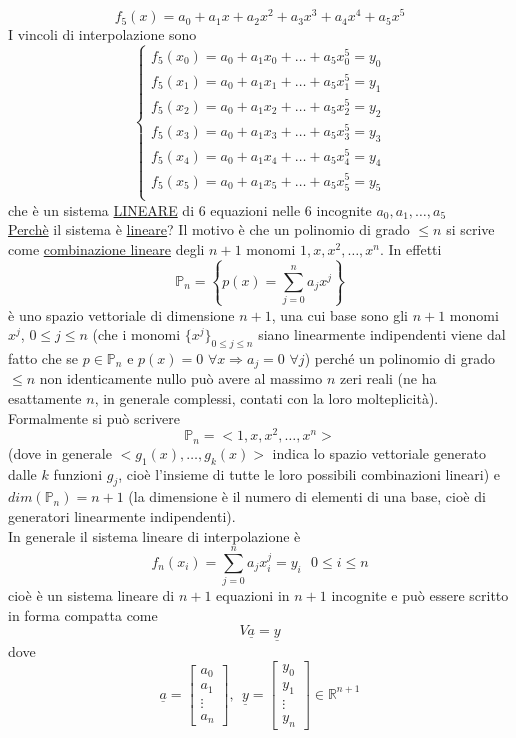 \documentclass[12pt]{article}
\begin{document}
\[
    f_5(x)=a_0+a_1x+a_2x^2+a_3x^3+a_4x^4+a_5x^5
\]
I vincoli di interpolazione sono 
\[
    \begin{cases}
        f_5(x_0)=a_0+a_1x_0+\dotso+a_5x_0^5=y_0\\
        f_5(x_1)=a_0+a_1x_1+\dotso+a_5x_1^5=y_1\\
        f_5(x_2)=a_0+a_1x_2+\dotso+a_5x_2^5=y_2\\
        f_5(x_3)=a_0+a_1x_3+\dotso+a_5x_3^5=y_3\\
        f_5(x_4)=a_0+a_1x_4+\dotso+a_5x_4^5=y_4\\
        f_5(x_5)=a_0+a_1x_5+\dotso+a_5x_5^5=y_5\\
    \end{cases}
\]
che è un sistema \underline{LINEARE} di 6 equazioni nelle 6 incognite $a_0,a_1,\dotso,a_5$\\ 
\underline{Perchè} il sistema è \underline{lineare}? Il motivo è che un polinomio di grado $\leq n$ si scrive come \underline{combinazione lineare} degli $n+1$ monomi $1, x, x^2, \dotso, x^n$. In effetti
\[
\mathbb{P}_n = \left\{p(x) = \sum\limits_{j=0}^n a_j x^j \right\}
\]
è uno spazio vettoriale di dimensione $n+1$, una cui base sono gli $n+1$ monomi $x^j$, $0 \leq j \leq n$ (che i monomi $\{ x^j \}_{0 \leq j \leq n}$ siano linearmente indipendenti viene dal fatto che se $p \in \mathbb{P}_n$ e $p(x) = 0$ $\forall x \Rightarrow a_j = 0$ $\forall j$) perché un polinomio di grado $\leq n$ non identicamente nullo può avere al massimo $n$ zeri reali (ne ha esattamente $n$, in generale complessi, contati con la loro molteplicità).\\
Formalmente si può scrivere
\[
\mathbb{P}_n = < 1, x, x^2, \dotso, x^n >
\]
(dove in generale $< g_1(x), \dotso, g_k(x) >$ indica lo spazio vettoriale generato dalle $k$ funzioni $g_j$, cioè l'insieme di tutte le loro possibili combinazioni lineari) e $dim(\mathbb{P}_n) = n+1$ (la dimensione è il numero di elementi di una base, cioè di generatori linearmente indipendenti).\\
In generale il sistema lineare di interpolazione è
\[
f_n(x_i) = \sum\limits_{j=0}^n a_j x_i^j = y_i \ \ \ 0 \leq i \leq n
\]
cioè è un sistema lineare di $n+1$ equazioni in $n+1$ incognite e può essere scritto in forma compatta come
\[
V\underline{a} = \underline{y}
\]
dove
\[
\underline{a} = 
    \begin{bmatrix}
    a_0 \\ a_1 \\ \vdots \\ a_n
    \end{bmatrix}, \ \
\underline{y} =
    \begin{bmatrix}
    y_0 \\ y_1 \\ \vdots \\ y_n
    \end{bmatrix}
    \in \mathbb{R}^{n+1}
\]
\end{document}
